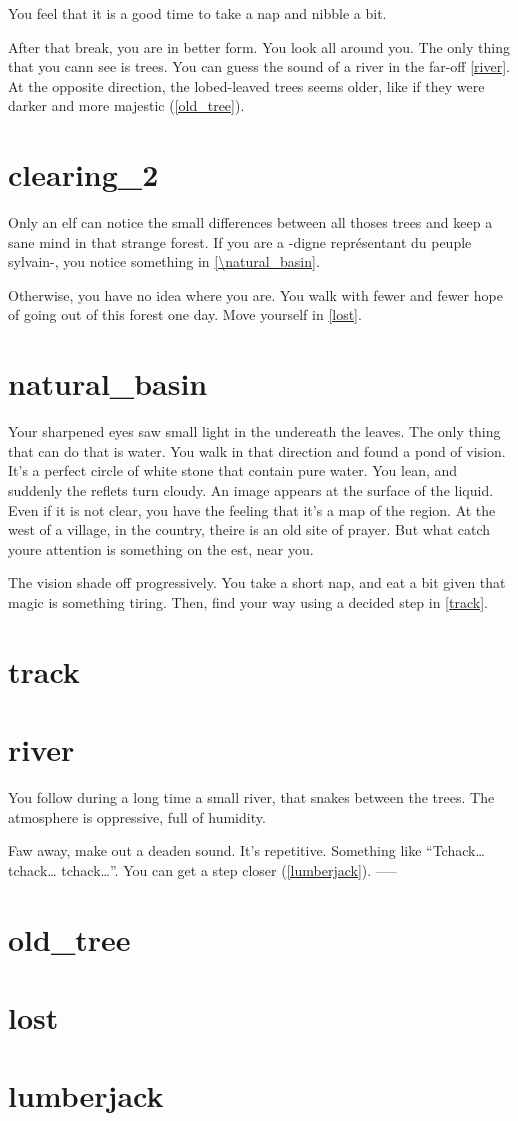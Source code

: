 You feel that it is a good time to take a nap and nibble a bit.

After that break, you are in better form. You look all around you. The only
thing that you cann see is trees. You can guess the sound of a river in the
far-off \ref{river}. At the opposite direction, the lobed-leaved trees seems
older, like if they were darker and more majestic (\ref{old_tree}).

\section{clearing_2}

Only an elf can notice the small differences between all thoses trees and keep a
sane mind in that strange forest. If you are a -digne représentant du peuple
sylvain-, you notice something in \ref{\natural_basin}.

Otherwise, you have no idea where you are. You walk with fewer and fewer hope of
going out of this forest one day. Move yourself in \ref{lost}.

\section{natural_basin}

Your sharpened eyes saw small light in the undereath the leaves. The only
thing that can do that is water. You walk in that direction and found a pond
of vision. It's a perfect circle of white stone that contain pure water. You
lean, and suddenly the reflets turn cloudy. An image appears at
the surface of the liquid. Even if it is not clear, you have the feeling that
it's a map of the region. At the west of a village, in the country, theire is an
old site of prayer. But what catch youre attention is something on the est,
near you.

The vision shade off progressively. You take a short nap, and eat a bit
given that magic is something tiring. Then, find your way using a decided step
in \ref{track}.

\section{track}
\section{river}

You follow during a long time a small river, that snakes between the trees.
The atmosphere is oppressive, full of humidity.

Faw away, make out a deaden sound. It's repetitive. Something like
``Tchack… tchack… tchack…''. You can get a step closer (\ref{lumberjack}).
-----
\section{old_tree}
\section{lost}
\section{lumberjack}
